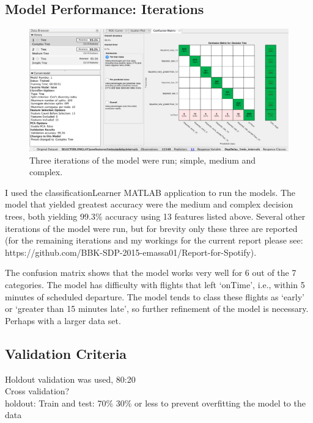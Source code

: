 \documentclass[a4paper, 10pt]{article}
\begin{document}
\subsection{Model Performance: Iterations}

\begin{figure}[H]
\begin{center}
\includegraphics[scale=0.3]{3models}
\caption{Three iterations of the model were run; simple, medium and complex.}
\label{3models}
\end{center}
\end{figure}


I used the classificationLearner MATLAB application to run the models. The model that yielded greatest accuracy were the medium and complex decision trees, both yielding 99.3\% accuracy using 13 features listed above. Several other iterations of the model were run, but for brevity only these three are reported (for the remaining iterations and my workings for the current report please see: https://github.com/BBK-SDP-2015-emassa01/Report-for-Spotify).

\vspace{5mm}
The confusion matrix shows that the model works very well for 6 out of the 7 categories. The model has difficulty with flights that left `onTime', i.e., within 5 minutes of scheduled departure. The model tends to class these flights as `early' or `greater than 15 minutes late', so further refinement of the model is necessary. Perhaps with a larger data set.

\subsection{Validation Criteria}
Holdout validation was used, 80:20\\
Cross validation?\\
holdout: Train and test: 70\% 30\% or less to prevent overfitting the model to the data\\
\end{document}
